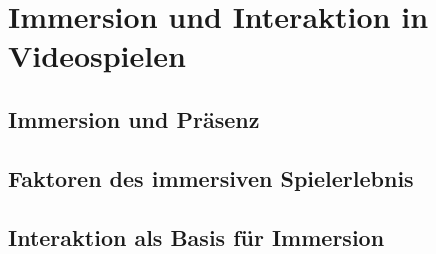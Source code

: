\chapter{Immersion und Interaktion in Videospielen}
\label{cha:Diplomschrift}

\section{Immersion und Präsenz}


\section{Faktoren des immersiven Spielerlebnis}
\label{sec:englisch}

\section{Interaktion als Basis für Immersion}
